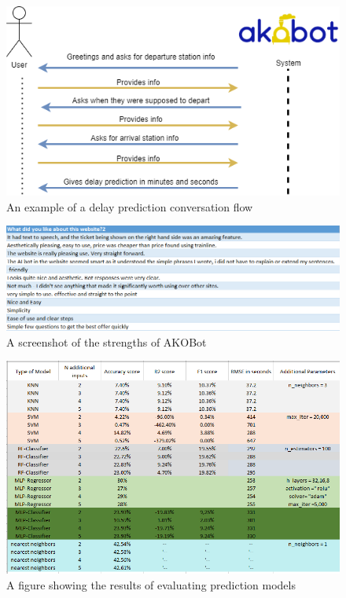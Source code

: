 \documentclass[11pt]{article}
\begin{document}
\begin{appendices}
    \begin{figure}[!ht]
            \centering
            \includegraphics[width=.95\textwidth]{PredictionFlow.png}
            \caption{An example of a delay prediction conversation flow}
            \label{fig:predictFlow}
    \end{figure}
    
    \begin{figure}
        \centering
        \includegraphics[width=\textwidth]{Akobotlikeval.png}
        \caption{A screenshot of the strengths of AKOBot}
        \label{fig:akobotPositive}
    \end{figure}
    
    \begin{figure}[!ht]
        \centering
        \includegraphics[width=\textwidth]{ModelsEval1.png}
        \caption{A figure showing the results of evaluating prediction models}
        \label{fig:modelEval}
    \end{figure}


\end{appendices}
\end{document}
